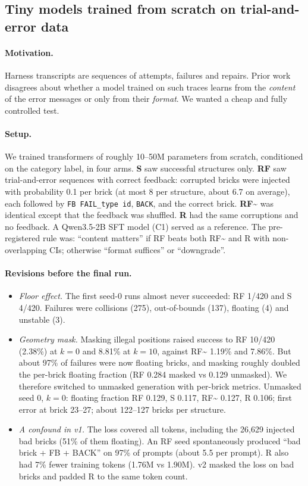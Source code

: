 \subsection{Tiny models trained from scratch on trial-and-error data}
\label{ex:tiny}
\paragraph{Motivation.} Harness transcripts are sequences of attempts, failures and repairs. Prior work disagrees about whether a model trained on such traces learns from the \emph{content} of the error messages or only from their \emph{format}. We wanted a cheap and fully controlled test.

\paragraph{Setup.} We trained transformers of roughly 10--50M parameters from scratch, conditioned on the category label, in four arms. \textbf{S} saw successful structures only. \textbf{RF} saw trial-and-error sequences with correct feedback: corrupted bricks were injected with probability 0.1 per brick (at most 8 per structure, about 6.7 on average), each followed by \texttt{FB FAIL\_type id}, \texttt{BACK}, and the correct brick. \textbf{RF\~{}} was identical except that the feedback was shuffled. \textbf{R} had the same corruptions and no feedback. A Qwen3.5-2B SFT model (C1) served as a reference. The pre-registered rule was: ``content matters'' if RF beats both RF\~{} and R with non-overlapping CIs; otherwise ``format suffices'' or ``downgrade''.

\paragraph{Revisions before the final run.}
\begin{itemize}\itemsep0pt
\item \emph{Floor effect.} The first seed-0 runs almost never succeeded: RF 1/420 and S 4/420. Failures were collisions (275), out-of-bounds (137), floating (4) and unstable (3).
\item \emph{Geometry mask.} Masking illegal positions raised success to RF 10/420 (2.38\%) at $k{=}0$ and 8.81\% at $k{=}10$, against RF\~{} 1.19\% and 7.86\%. But about 97\% of failures were now floating bricks, and masking roughly doubled the per-brick floating fraction (RF 0.284 masked vs 0.129 unmasked). We therefore switched to unmasked generation with per-brick metrics. Unmasked seed 0, $k{=}0$: floating fraction RF 0.129, S 0.117, RF\~{} 0.127, R 0.106; first error at brick 23--27; about 122--127 bricks per structure.
\item \emph{A confound in v1.} The loss covered all tokens, including the 26{,}629 injected bad bricks (51\% of them floating). An RF seed spontaneously produced ``bad brick + FB + BACK'' on 97\% of prompts (about 5.5 per prompt). R also had 7\% fewer training tokens (1.76M vs 1.90M). v2 masked the loss on bad bricks and padded R to the same token count.
\end{itemize}

